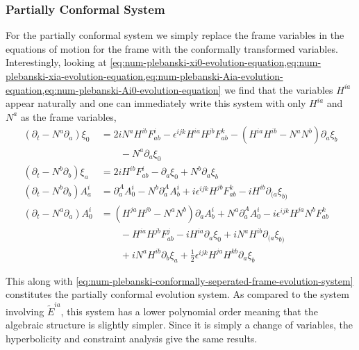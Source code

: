 \documentclass[10pt]{report}
\theoremstyle{definition}
\newcommand{\tE}[0]{\tilde{E}}
\begin{document}
        \subsubsection{Partially Conformal System}
        For the partially conformal system we simply replace the frame variables in the equations of motion for the frame with the conformally transformed variables. Interestingly, looking at \cref{eq:num-plebanski-xi0-evolution-equation,eq:num-plebanski-xia-evolution-equation,eq:num-plebanski-Aia-evolution-equation,eq:num-plebanski-Ai0-evolution-equation} we find that the variables $H^{ia}$ appear naturally and one can immediately write this system with only $H^{ia}$ and $N^a$ as the frame variables,
        \begin{equation} \label{eq:num-nonlinear-partial-conformal-connection-system}
        \begin{aligned}
            (\partial_t - N^a \partial_a) \xi_0 & = 2i N^a H^{ib} F^i_{ab} - \epsilon^{ijk} H^{ia} H^{jb} F^k_{ab} - (H^{ia} H^{ib} - N^a N^b) \partial_a \xi_b \\ & \quad\quad  - N^a \partial_a \xi_0 \\
            (\partial_t - N^b \partial_b) \xi_a & = 2i H^{ib} F^i_{ab} - \partial_a \xi_0 + N^b \partial_a \xi_b \\
            (\partial_t - N^b \partial_b) A^i_a & = \partial^A_a A^i_0 - N^b \partial_a^A A^i_b + i \epsilon^{ijk} H^{jb} F^k_{ab} - i H^{ib} \partial_{(a} \xi_{b)} \\
            (\partial_t - N^a \partial_a) A^i_0 & = (H^{ja} H^{jb} - N^a N^b) \partial_a A^i_b + N^a \partial^A_a A^i_0 - i \epsilon^{ijk} H^{ja} N^b F^k_{ab} \\ & \quad\quad -H^{ia} H^{jb} F^j_{ab} - i H^{ia} \partial_a \xi_0 + i N^a H^{ib} \partial_{(a} \xi_{b)} \\  & \quad\quad +i N^a H^{ib} \partial_b \xi_a + \frac{1}{2} \epsilon^{ijk} H^{ja} H^{kb} \partial_a \xi_b
        \end{aligned} 
        \end{equation}

        This along with \cref{eq:num-plebanski-conformally-seperated-frame-evolution-system} constitutes the partially conformal evolution system. As compared to the system involving $\tE^{ia}$, this system has a lower polynomial order meaning that the algebraic structure is slightly simpler. Since it is simply a change of variables, the hyperbolicity and constraint analysis give the same results.
\end{document}
